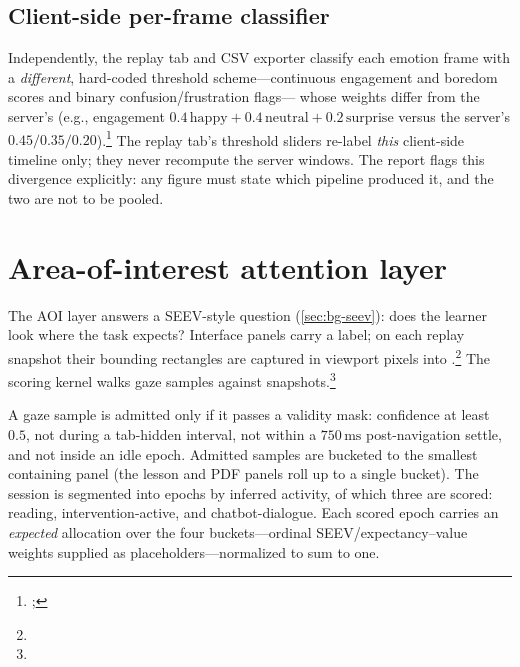 \subsection{Client-side per-frame classifier}
Independently, the replay tab and CSV exporter classify each emotion frame
with a \emph{different}, hard-coded threshold scheme---continuous
engagement and boredom scores and binary confusion/frustration flags---
whose weights differ from the server's (e.g., engagement
$0.4\,\text{happy}+0.4\,\text{neutral}+0.2\,\text{surprise}$ versus the
server's $0.45/0.35/0.20$).\footnote{;
} The replay tab's threshold sliders
re-label \emph{this} client-side timeline only; they never recompute the
server windows. The report flags this divergence explicitly: any figure
must state which pipeline produced it, and the two are not to be pooled.

\section{Area-of-interest attention layer}
\label{sec:sensing-aoi}

The AOI layer answers a SEEV-style question (\cref{sec:bg-seev}): does the
learner look where the task expects? Interface panels carry a
 label; on each replay snapshot their bounding
rectangles are captured in viewport pixels into
.\footnote{}
The scoring kernel walks gaze samples against snapshots.\footnote{}

A gaze sample is admitted only if it passes a validity mask: confidence at
least $0.5$, not during a tab-hidden interval, not within a
$750\,\text{ms}$ post-navigation settle, and not inside an idle epoch.
Admitted samples are bucketed to the smallest containing panel (the
lesson and PDF panels roll up to a single  bucket).
The session is segmented into epochs by inferred activity, of which three
are scored: reading, intervention-active, and chatbot-dialogue. Each
scored epoch carries an \emph{expected} allocation over the four
buckets---ordinal SEEV/expectancy--value weights supplied as
placeholders---normalized to sum to one.

